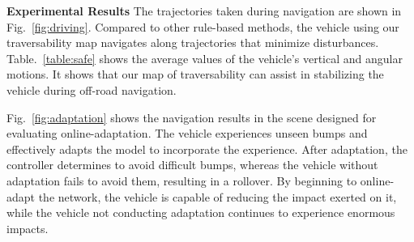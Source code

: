 \textbf{Experimental Results} The trajectories taken during navigation are shown in Fig.~\ref{fig:driving}. Compared to other rule-based methods, the vehicle using our traversability map navigates along trajectories that minimize disturbances. Table.~\ref{table:safe} shows the average values of the vehicle's vertical and angular motions. It shows that our map of traversability can assist in stabilizing the vehicle during off-road navigation.


Fig.~\ref{fig:adaptation} shows the navigation results in the scene designed for evaluating online-adaptation. The vehicle experiences unseen bumps and effectively adapts the model to incorporate the experience. After adaptation, the controller determines to avoid difficult bumps, whereas the vehicle without adaptation fails to avoid them, resulting in a rollover. By beginning to online-adapt the network, the vehicle is capable of reducing the impact exerted on it, while the vehicle not conducting adaptation continues to experience enormous impacts.